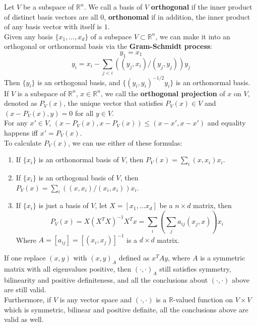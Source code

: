 \documentclass[20pt]{article} %
\theoremstyle{break}
\begin{document}
Let $V$ be a subspace of $\mathbb{R}^n$. We call a basis of $V$ {\bf orthogonal} if the inner product of distinct basis vectors are all $0$, {\bf orthonomal} if in addition, the inner product of any basis vector with itself is $1$.\\

Given any basis $\{x_1, \dots, x_d\}$ of a subspace $V\subset \mathbb{R}^n$, we can make it into an orthogonal or orthonormal basis via the {\bf Gram-Schmidt process}:
\[y_1=x_1\]
\[y_i=x_i-\sum_{j<i}((y_j, x_i)/(y_j, y_j))y_j\]
Then $\{y_i\}$ is an orthogonal basis, and $\{(y_i, y_i)^{-1/2}y_i\}$ is an orthonormal basis.\\

If $V$ is a subspace of $\mathbb{R}^n$, $x\in \mathbb{R}^n$, we call the {\bf orthogonal projection} of $x$ on $V$, denoted as $P_V(x)$, the unique vector that satisfies $P_V(x)\in V$ and $(x-P_V(x), y)=0$ for all $y\in V$.\\

For any $x'\in V$, $(x-P_V(x), x-P_V(x))\leq (x-x', x-x')$ and equality happens iff $x'=P_V(x)$.\\

To calculate $P_V(x)$, we can use either of these formulas:

\begin{enumerate}
\item If $\{x_i\}$ is an orthonormal basis of $V$, then $P_V(x)=\sum_i(x, x_i)x_i$.
\item If $\{x_i\}$ is an orthogonal basis of $V$, then $P_V(x)=\sum_i((x, x_i)/(x_i, x_i))x_i$.
\item If $\{x_i\}$ is just a basis of $V$, let $X=[x_1, \dots x_d]$ be a $n\times d$ matrix, then
  \[P_V(x)=X(X^TX)^{-1}X^Tx=\sum_i(\sum_j a_{ij}(x_j, x)) x_i\]
  Where $A=[a_{ij}]=[(x_i, x_j)]^{-1}$ is a $d\times d$ matrix. 
\end{enumerate}

If one replace $(x, y)$ with $(x, y)_A$ defined as $x^TAy$, where $A$ is a symmetric matrix with all eigenvalues positive, then $(\cdot, \cdot)_A$ still satisfies symmetry, bilinearity and positive definiteness, and all the conclusions about $(\cdot, \cdot)$ above are still valid.\\

Furthermore, if $V$ is any vector space and $(\cdot, \cdot)$ is a $\mathbb{R}$-valued function on $V\times V$ which is symmetric, bilinear and positive definite, all the conclusions above are valid as well.
\end{document}
